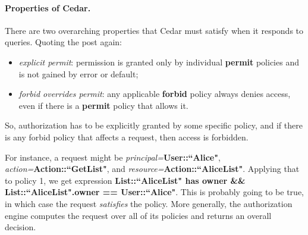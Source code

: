 \documentclass[11pt]{article}
\begin{document}
\paragraph{Properties of Cedar.} There are two overarching properties that Cedar must satisfy
when it responds to queries. Quoting the post again:
\begin{itemize}[noitemsep]
\item \emph{explicit permit}: permission is granted only by individual \textbf{permit} policies and is not gained by error or default;
\item \emph{forbid overrides permit}: any applicable \textbf{forbid} policy always denies access, even if there is a \textbf{permit} policy that allows it.
\end{itemize}
So, authorization has to be explicitly granted by some specific policy, and if there is any forbid policy that affects a request, then access is forbidden.

For instance, a request might be \textit{principal=}\textbf{User::``Alice"}, \textit{action=}\textbf{Action::``GetList"}, and \textit{resource=}\textbf{Action::``AliceList"}. Applying that to policy 1, we get expression \textbf{List::``AliceList" has owner \&\& List::``AliceList".owner == User::``Alice"}. This is probably going to be true, in which case the request \emph{satisfies} the policy. More generally, the authorization engine computes the request over all of its policies and returns an overall decision.
\end{document}
